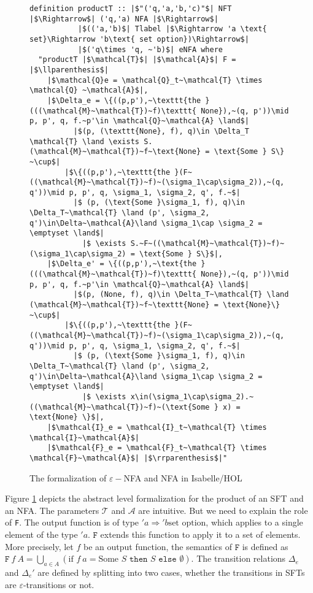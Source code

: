 \documentclass[a4paper,UKenglish,cleveref, autoref, thm-restate]{lipics-v2021}
\begin{document}
\begin{figure}[ht]
	\begin{lstlisting}
definition productT :: |$"('q,'a,'b,'c)"$| NFT |$\Rightarrow$| ('q,'a) NFA |$\Rightarrow$| 
           |$(('a,'b)$| Tlabel |$\Rightarrow 'a \text{ set}\Rightarrow 'b\text{ set option})\Rightarrow$|
           |$('q\times 'q, ~'b)$| eNFA where
  "productT |$\mathcal{T}$| |$\mathcal{A}$| F = |$\llparenthesis$|
    |$\mathcal{Q}e = \mathcal{Q}_t~\mathcal{T} \times \mathcal{Q} ~\mathcal{A}$|,
    |$\Delta_e = \{((p,p'),~\texttt{the }(((\mathcal{M}~\mathcal{T})~f)\texttt{ None}),~(q, p'))\mid p, p', q, f.~p'\in \mathcal{Q}~\mathcal{A} \land$|
          |$(p, (\texttt{None}, f), q)\in \Delta_T \mathcal{T} \land \exists S. (\mathcal{M}~\mathcal{T})~f~\text{None} = \text{Some } S\} ~\cup$|
        |$\{((p,p'),~\texttt{the }(F~((\mathcal{M}~\mathcal{T})~f)~(\sigma_1\cap\sigma_2)),~(q, q'))\mid p, p', q, \sigma_1, \sigma_2, q', f.~$|
          |$ (p, (\text{Some }\sigma_1, f), q)\in \Delta_T~\mathcal{T} \land (p', \sigma_2, q')\in\Delta~\mathcal{A}\land \sigma_1\cap \sigma_2 = \emptyset \land$|
            |$ \exists S.~F~((\mathcal{M}~\mathcal{T})~f)~(\sigma_1\cap\sigma_2) = \text{Some } S\}$|,
    |$\Delta_e' = \{((p,p'),~\text{the }(((\mathcal{M}~\mathcal{T})~f)\texttt{ None}),~(q, p'))\mid p, p', q, f.~p'\in \mathcal{Q}~\mathcal{A} \land$|
          |$(p, (None, f), q)\in \Delta_T~\mathcal{T} \land (\mathcal{M}~\mathcal{T})~f~\texttt{None} = \text{None}\} ~\cup$|
        |$\{((p,p'),~\texttt{the }(F~((\mathcal{M}~\mathcal{T})~f)~(\sigma_1\cap\sigma_2)),~(q, q'))\mid p, p', q, \sigma_1, \sigma_2, q', f.~$|
          |$ (p, (\text{Some }\sigma_1, f), q)\in \Delta_T~\mathcal{T} \land (p', \sigma_2, q')\in\Delta~\mathcal{A}\land \sigma_1\cap \sigma_2 = \emptyset \land$|
            |$ \exists x\in(\sigma_1\cap\sigma_2).~((\mathcal{M}~\mathcal{T})~f)~(\text{Some } x) = \text{None} \}$|,
    |$\mathcal{I}_e = \mathcal{I}_t~\mathcal{T} \times \mathcal{I}~\mathcal{A}$|
    |$\mathcal{F}_e = \mathcal{F}_t~\mathcal{T} \times \mathcal{F}~\mathcal{A}$| |$\rrparenthesis$|"
	\end{lstlisting}
\caption{The formalization of $\varepsilon-$NFA and NFA in Isabelle/HOL}
\label{fig-def-FTProd}
\end{figure}

Figure \ref{fig-def-FTProd} depicts the abstract level formalization for the product of an SFT and an NFA. The parameters $\mathcal{T}$ and $\mathcal{A}$ are intuitive. But we need to explain the role of \texttt{F}. The output function is of type $'a \Rightarrow 'b \text{set option}$, which applies to a single element of the type $'a$. $\texttt{F}$ extends this function to apply it to a set of elements. More precisely, let $f$ be an output function, the semantics of $\texttt{F}$ is defined as $\texttt{F}~f~A=\bigcup_{a\in A} (\text{if }f~a= \text{Some }S \texttt{ then } S \texttt{ else } \emptyset)$.
The transition relations $\Delta_e$ and $\Delta_e'$ are defined by splitting into two cases, whether the transitions in SFTs are $\varepsilon$-transitions or not. 
\end{document}
